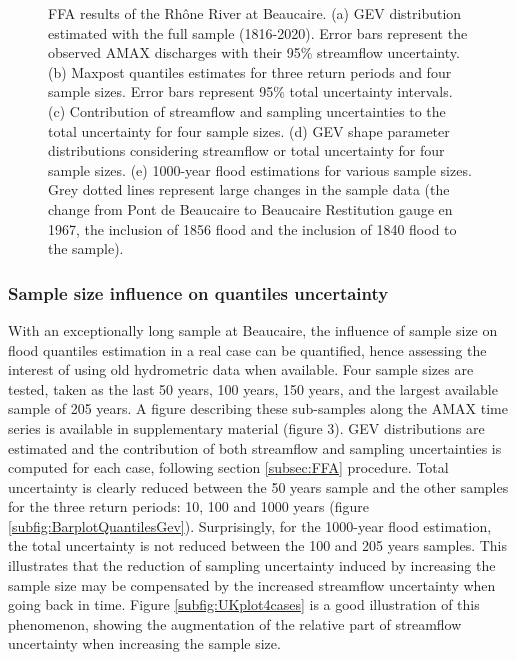 \documentclass[11pt]{article}
\begin{document}
\begin{figure}[p]
            
        \caption{FFA results of the Rhône River at Beaucaire. (a) GEV distribution estimated with the full sample (1816-2020). Error bars represent the observed AMAX discharges with their 95\% streamflow uncertainty.
        (b) Maxpost quantiles estimates for three return periods and four sample sizes. Error bars represent 95\% total uncertainty intervals.
        (c) Contribution of streamflow and sampling uncertainties to the total uncertainty for four sample sizes. 
        (d) GEV shape parameter distributions considering streamflow or total uncertainty for four sample sizes. 
        (e) 1000-year flood estimations for various sample sizes. Grey dotted lines represent large changes in the sample data (the change from Pont de Beaucaire to Beaucaire Restitution gauge en 1967, the inclusion of 1856 flood and the inclusion of 1840 flood to the sample).}
        \label{fig:Quantiles}
        \end{figure}

        \subsubsection{Sample size influence on quantiles uncertainty}
        \label{subsec:SampleSize}
        
        With an exceptionally long sample at Beaucaire, the influence of sample size on flood quantiles estimation in a real case can be quantified, hence assessing the interest of using old hydrometric data when available. Four sample sizes are tested, taken as the last 50 years, 100 years, 150 years, and the largest available sample of 205 years. A figure describing these sub-samples along the AMAX time series is available in supplementary material (figure 3). GEV distributions are estimated and the contribution of both streamflow and sampling uncertainties is computed for each case, following section \ref{subsec:FFA} procedure. Total uncertainty is clearly reduced between the 50 years sample and the other samples for the three return periods: 10, 100 and 1000 years (figure \ref{subfig:BarplotQuantilesGev}). Surprisingly, for the 1000-year flood estimation, the total uncertainty is not reduced between the 100 and 205 years samples. This illustrates that the reduction of sampling uncertainty induced by increasing the sample size may be compensated by the increased streamflow uncertainty when going back in time. Figure \ref{subfig:UKplot4cases} is a good illustration of this phenomenon, showing the augmentation of the relative part of streamflow uncertainty when increasing the sample size.
        
\end{document}

